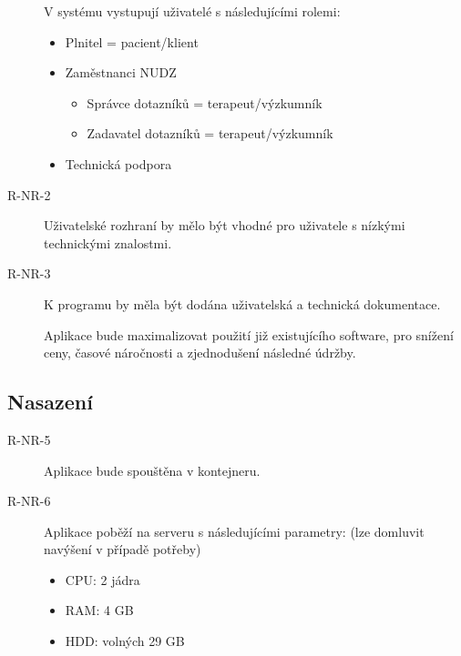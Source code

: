 \begin{description}
    \item[]
    V systému vystupují uživatelé s následujícími rolemi:

    \begin{itemize}
        \item
        Plnitel = pacient/klient

        \item
        Zaměstnanci NUDZ

        \begin{itemize}
            \item
            Správce dotazníků = terapeut/výzkumník
            \item
            Zadavatel dotazníků = terapeut/výzkumník
        \end{itemize}
        \item
        Technická podpora
    \end{itemize}
    \item[R-NR-2]
    Uživatelské rozhraní by mělo být vhodné pro uživatele s nízkými technickými znalostmi.
    \item[R-NR-3]
    K programu by měla být dodána uživatelská a technická dokumentace.
    \item[]
    Aplikace bude maximalizovat použití již existujícího software, pro snížení ceny, časové náročnosti a zjednodušení následné údržby.
\end{description}

\subsection{Nasazení}\label{subsec:deployment}

\begin{description}
    \item[R-NR-5]
    Aplikace bude spouštěna v kontejneru.
    \item[R-NR-6]
    Aplikace poběží na serveru s následujícími parametry: (lze domluvit navýšení v případě potřeby)

    \begin{itemize}
        \item
        CPU: 2 jádra
        \item
        RAM: 4 GB
        \item
        HDD: volných 29 GB
    \end{itemize}
\end{description}

